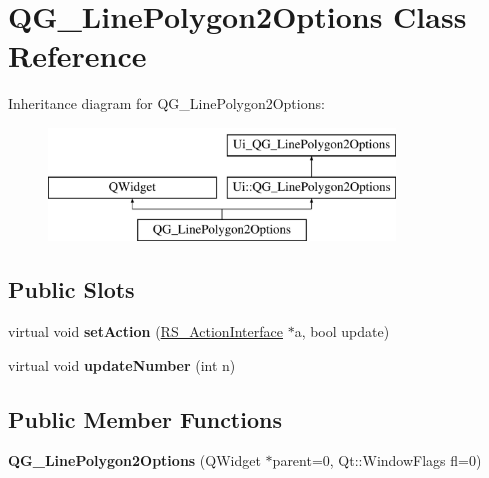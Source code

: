 \hypertarget{classQG__LinePolygon2Options}{\section{Q\-G\-\_\-\-Line\-Polygon2\-Options Class Reference}
\label{classQG__LinePolygon2Options}
}
Inheritance diagram for Q\-G\-\_\-\-Line\-Polygon2\-Options\-:\begin{figure}[H]
\begin{center}
\leavevmode
\includegraphics[height=3.000000cm]{classQG__LinePolygon2Options}
\end{center}
\end{figure}
\subsection*{Public Slots}
\begin{DoxyCompactItemize}
\item 
\hypertarget{classQG__LinePolygon2Options_a0384439731f631aa932528710c7efa27}{virtual void {\bfseries set\-Action} (\hyperlink{classRS__ActionInterface}{R\-S\-\_\-\-Action\-Interface} $\ast$a, bool update)}\label{classQG__LinePolygon2Options_a0384439731f631aa932528710c7efa27}

\item 
\hypertarget{classQG__LinePolygon2Options_a4c12906ad565c0ce8e505c93951633b2}{virtual void {\bfseries update\-Number} (int n)}\label{classQG__LinePolygon2Options_a4c12906ad565c0ce8e505c93951633b2}

\end{DoxyCompactItemize}
\subsection*{Public Member Functions}
\begin{DoxyCompactItemize}
\item 
\hypertarget{classQG__LinePolygon2Options_a9cde30659789edc7e4db0ba5c0876712}{{\bfseries Q\-G\-\_\-\-Line\-Polygon2\-Options} (Q\-Widget $\ast$parent=0, Qt\-::\-Window\-Flags fl=0)}\label{classQG__LinePolygon2Options_a9cde30659789edc7e4db0ba5c0876712}

\end{DoxyCompactItemize}
